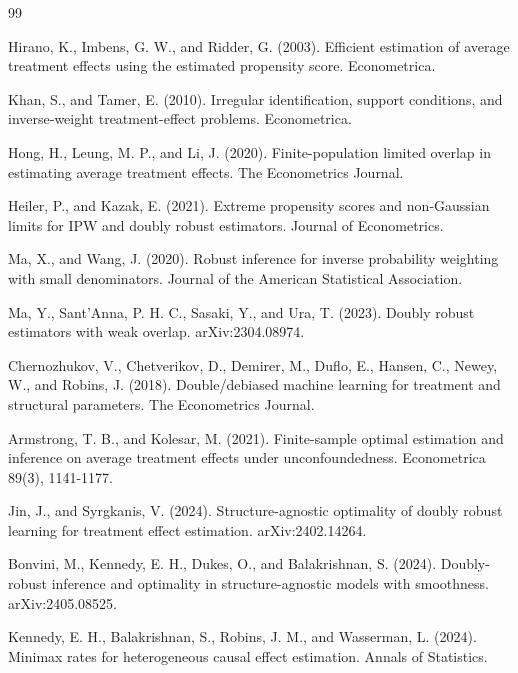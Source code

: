 \documentclass{article}
\begin{document}
\begin{thebibliography}{99}

   Hirano, K., Imbens, G. W., and Ridder, G. (2003). Efficient estimation of average treatment effects using the estimated propensity score. Econometrica.

   Khan, S., and Tamer, E. (2010). Irregular identification, support conditions, and inverse-weight treatment-effect problems. Econometrica.

   Hong, H., Leung, M. P., and Li, J. (2020). Finite-population limited overlap in estimating average treatment effects. The Econometrics Journal.

   Heiler, P., and Kazak, E. (2021). Extreme propensity scores and non-Gaussian limits for IPW and doubly robust estimators. Journal of Econometrics.

   Ma, X., and Wang, J. (2020). Robust inference for inverse probability weighting with small denominators. Journal of the American Statistical Association.

   Ma, Y., Sant'Anna, P. H. C., Sasaki, Y., and Ura, T. (2023). Doubly robust estimators with weak overlap. arXiv:2304.08974.

   Chernozhukov, V., Chetverikov, D., Demirer, M., Duflo, E., Hansen, C., Newey, W., and Robins, J. (2018). Double/debiased machine learning for treatment and structural parameters. The Econometrics Journal.

   Armstrong, T. B., and Kolesar, M. (2021). Finite-sample optimal estimation and inference on average treatment effects under unconfoundedness. Econometrica 89(3), 1141-1177.

   Jin, J., and Syrgkanis, V. (2024). Structure-agnostic optimality of doubly robust learning for treatment effect estimation. arXiv:2402.14264.

   Bonvini, M., Kennedy, E. H., Dukes, O., and Balakrishnan, S. (2024). Doubly-robust inference and optimality in structure-agnostic models with smoothness. arXiv:2405.08525.

   Kennedy, E. H., Balakrishnan, S., Robins, J. M., and Wasserman, L. (2024). Minimax rates for heterogeneous causal effect estimation. Annals of Statistics.


\end{thebibliography}
\end{document}
